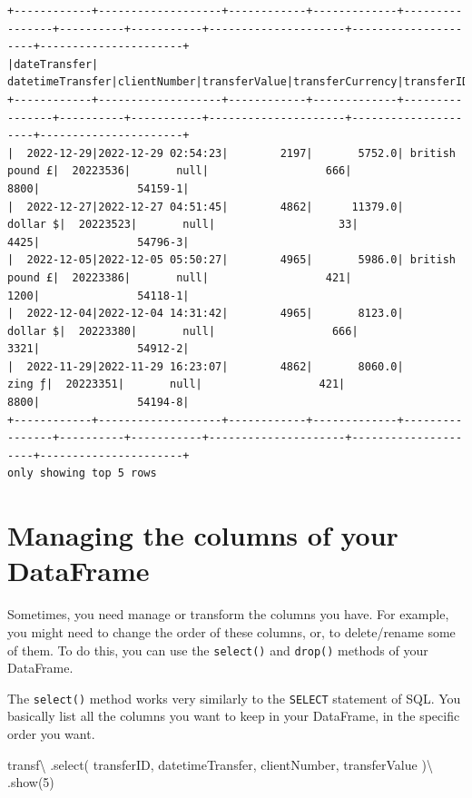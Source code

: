 \documentclass[
  11pt,
  letterpaper,
  DIV=11,
  numbers=noendperiod]{scrreprt}
\newenvironment{Shaded}{\begin{snugshade}}{\end{snugshade}}
\newcommand{\DecValTok}[1]{\textcolor[rgb]{0.68,0.00,0.00}{#1}}
\newcommand{\NormalTok}[1]{\textcolor[rgb]{0.00,0.23,0.31}{#1}}
\newcommand{\OperatorTok}[1]{\textcolor[rgb]{0.37,0.37,0.37}{#1}}
\newcommand{\StringTok}[1]{\textcolor[rgb]{0.13,0.47,0.30}{#1}}
\begin{document}
\begin{verbatim}
+------------+-------------------+------------+-------------+----------------+----------+-----------+---------------------+---------------------+----------------------+
|dateTransfer|   datetimeTransfer|clientNumber|transferValue|transferCurrency|transferID|transferLog|destinationBankNumber|destinationBankBranch|destinationBankAccount|
+------------+-------------------+------------+-------------+----------------+----------+-----------+---------------------+---------------------+----------------------+
|  2022-12-29|2022-12-29 02:54:23|        2197|       5752.0| british pound £|  20223536|       null|                  666|                 8800|               54159-1|
|  2022-12-27|2022-12-27 04:51:45|        4862|      11379.0|        dollar $|  20223523|       null|                   33|                 4425|               54796-3|
|  2022-12-05|2022-12-05 05:50:27|        4965|       5986.0| british pound £|  20223386|       null|                  421|                 1200|               54118-1|
|  2022-12-04|2022-12-04 14:31:42|        4965|       8123.0|        dollar $|  20223380|       null|                  666|                 3321|               54912-2|
|  2022-11-29|2022-11-29 16:23:07|        4862|       8060.0|          zing ƒ|  20223351|       null|                  421|                 8800|               54194-8|
+------------+-------------------+------------+-------------+----------------+----------+-----------+---------------------+---------------------+----------------------+
only showing top 5 rows
\end{verbatim}

\hypertarget{managing-the-columns-of-your-dataframe}{%
\section{Managing the columns of your
DataFrame}\label{managing-the-columns-of-your-dataframe}}

Sometimes, you need manage or transform the columns you have. For
example, you might need to change the order of these columns, or, to
delete/rename some of them. To do this, you can use the
\texttt{select()} and \texttt{drop()} methods of your DataFrame.

The \texttt{select()} method works very similarly to the \texttt{SELECT}
statement of SQL. You basically list all the columns you want to keep in
your DataFrame, in the specific order you want.

\begin{Shaded}
\begin{Highlighting}[]
\NormalTok{transf}\OperatorTok{\textbackslash{}}
\NormalTok{  .select(}
    \StringTok{\textquotesingle{}transferID\textquotesingle{}}\NormalTok{, }\StringTok{\textquotesingle{}datetimeTransfer\textquotesingle{}}\NormalTok{,}
    \StringTok{\textquotesingle{}clientNumber\textquotesingle{}}\NormalTok{, }\StringTok{\textquotesingle{}transferValue\textquotesingle{}}
\NormalTok{  )}\OperatorTok{\textbackslash{}}
\NormalTok{  .show(}\DecValTok{5}\NormalTok{)}
\end{Highlighting}
\end{Shaded}
\end{document}
